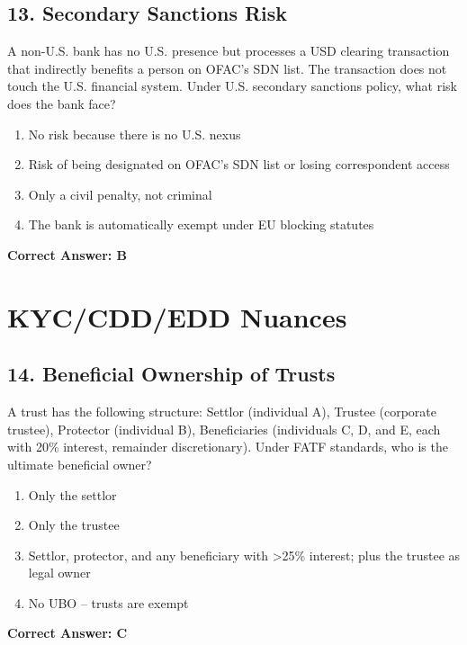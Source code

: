 \documentclass[11pt,a4paper]{article}
\begin{document}
	\subsection{13. Secondary Sanctions Risk}
	A non-U.S. bank has no U.S. presence but processes a USD clearing transaction that indirectly benefits a person on OFAC’s SDN list. The transaction does not touch the U.S. financial system. Under U.S. secondary sanctions policy, what risk does the bank face?
	\begin{enumerate}[label=\Alph*.]
		\item No risk because there is no U.S. nexus
		\item Risk of being designated on OFAC’s SDN list or losing correspondent access
		\item Only a civil penalty, not criminal
		\item The bank is automatically exempt under EU blocking statutes
	\end{enumerate}
	\textbf{Correct Answer: B}
	
	\section{KYC/CDD/EDD Nuances}
	
	\subsection{14. Beneficial Ownership of Trusts}
	A trust has the following structure: Settlor (individual A), Trustee (corporate trustee), Protector (individual B), Beneficiaries (individuals C, D, and E, each with 20\% interest, remainder discretionary). Under FATF standards, who is the ultimate beneficial owner?
	\begin{enumerate}[label=\Alph*.]
		\item Only the settlor
		\item Only the trustee
		\item Settlor, protector, and any beneficiary with >25\% interest; plus the trustee as legal owner
		\item No UBO – trusts are exempt
	\end{enumerate}
	\textbf{Correct Answer: C}
	
\end{document}
